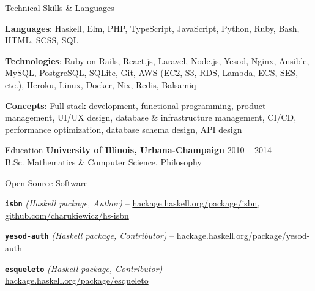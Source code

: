 \documentclass{resume} %
\begin{document}
\begin{rSection}{Technical Skills \& Languages}

\begin{rListSection}
\item \textbf{Languages}: Haskell, Elm, PHP, TypeScript, JavaScript, Python, Ruby, Bash, HTML, SCSS, SQL
\item \textbf{Technologies}:  Ruby on Rails, React.js, Laravel, Node.js, Yesod, Nginx, Ansible, MySQL, PostgreSQL, SQLite, Git, AWS (EC2, S3, RDS, Lambda, ECS, SES, etc.), Heroku, Linux, Docker, Nix, Redis, Balsamiq
\item \textbf{Concepts}: Full stack development, functional programming, product management, UI/UX design, database \& infrastructure management, CI/CD, performance optimization, database schema design, API design
\end{rListSection}

\end{rSection}


\begin{rSection}{Education}
{\bf University of Illinois, Urbana-Champaign} \hfill {\textsc{2010 -- 2014}} \\
B.Sc. Mathematics \& Computer Science, Philosophy
\end{rSection}


\begin{rSection}{Open Source Software}

\begin{rListSection}
\item \textbf{\texttt{isbn}} {\em (Haskell package, Author)} -- \href{https://hackage.haskell.org/package/isbn}{hackage.haskell.org/package/isbn}, \href{https://github.com/charukiewicz/hs-isbn}{github.com/charukiewicz/hs-isbn}
\item \textbf{\texttt{yesod-auth}} {\em (Haskell package, Contributor)} -- \href{https://hackage.haskell.org/package/yesod-auth}{hackage.haskell.org/package/yesod-auth}
\item \textbf{\texttt{esqueleto}} {\em (Haskell package, Contributor)} -- \href{https://hackage.haskell.org/package/esqueleto}{hackage.haskell.org/package/esqueleto}
\end{rListSection}

\end{rSection}
\end{document}
